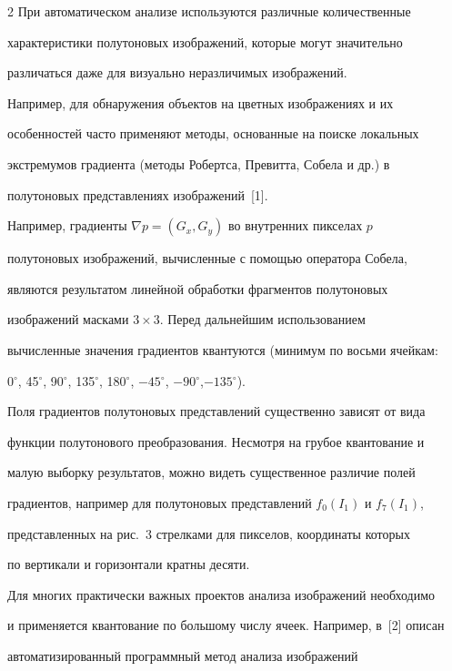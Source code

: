 \begin{multicols}{2}
  При автоматическом анализе используются различ\-ные количественные

характеристики полутоновых изображений, которые могут значительно

различаться даже для визуально неразличимых изоб\-ра\-жений.



  Например, для обнаружения объектов на цветных изображениях и их

особенностей часто применяют методы, основанные на поиске локальных

экстремумов градиента (методы Робертса, Превитта, Собела и др.) в

полутоновых представлениях изображений~[1].



  Например, градиенты $\nabla p = (G_x, G_y)$ во внут\-рен\-них пикселах $p$

полутоновых изображений, вычисленные с помощью оператора Собела,

являются результатом линейной обработки фрагментов полутоновых

изображений масками $3\times 3$. Перед дальнейшим использованием

вычисленные значения градиентов квантуются (минимум по восьми ячейкам:

0$^\circ$, 45$^\circ$, 90$^\circ$, 135$^\circ$, 180$^\circ$, $-45$$^\circ$, $-

90$$^\circ$,\linebreak $-135$$^\circ$).



  Поля градиентов полутоновых представлений существенно зависят от вида

функции полутонового преобразования. Несмотря на грубое квантование и

малую выборку результатов, можно \mbox{видеть} существенное различие полей

градиентов, например для полутоновых представлений $f_0(I_1)$ и $f_7(I_1)$,

 представленных на рис.~3 стрелками для пикселов, координаты которых

по вертикали и горизонтали кратны десяти.



  Для многих практически важных проектов анализа изображений необходимо

и применяется квантование по большому числу ячеек. Например, в~[2] описан

автоматизированный программный метод анализа изображений


\end{multicols}
